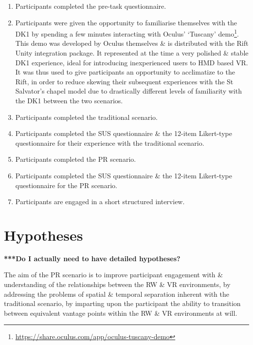 \begin{enumerate}
	\item Participants completed the pre-task questionnaire.
	
	\item Participants were given the opportunity to familiarise themselves with the DK1 by spending a few minutes interacting with Oculus' `Tuscany' demo\footnote{\url{https://share.oculus.com/app/oculus-tuscany-demo}}. This demo was developed by Oculus themselves \& is distributed with the Rift Unity integration package. It represented at the time a very polished \& stable DK1 experience, ideal for introducing inexperienced users to HMD based VR. It was thus used to give participants an opportunity to acclimatize to the Rift, in order to reduce skewing their subsequent experiences with the St Salvator's chapel model due to drastically different levels of familiarity with the DK1 between the two scenarios.
	
	\item Participants completed the traditional scenario.
	
	\item Participants completed the SUS questionnaire \& the 12-item Likert-type questionnaire for their experience with the traditional scenario.
	
	\item Participants completed the PR scenario.
	
	\item Participants completed the SUS questionnaire \& the 12-item Likert-type questionnaire for the PR scenario.
	
	\item Participants are engaged in a short structured interview.
\end{enumerate}


\section{Hypotheses}

\textbf{***Do I actually need to have detailed hypotheses?}

The aim of the PR scenario is to improve participant engagement with \& understanding of the relationships between the RW \& VR environments, by addressing the problems of spatial \& temporal separation inherent with the traditional scenario, by imparting upon the participant the ability to transition between equivalent vantage points within the RW \& VR environments at will.


